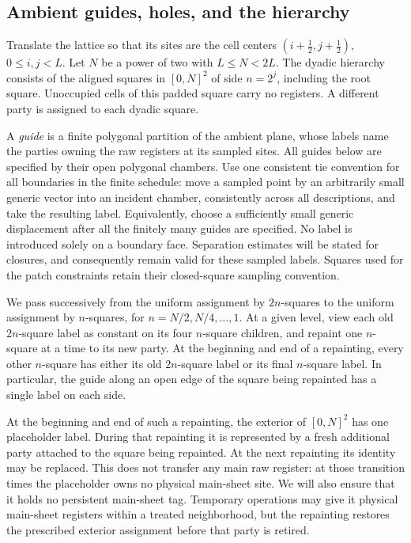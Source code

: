 \documentclass[11pt]{article}
\numberwithin{equation}{section}
\theoremstyle{definition}
\theoremstyle{remark}
\begin{document}
\subsection{Ambient guides, holes, and the hierarchy}

Translate the lattice so that its sites are the cell centers
$(i+\tfrac12,j+\tfrac12)$, $0\le i,j<L$.  Let $N$ be a power of two
with $L\le N<2L$.  The dyadic hierarchy consists of the aligned squares
in $[0,N]^2$ of side $n=2^j$, including the root square.  Unoccupied
cells of this padded square carry no registers.  A different party is
assigned to each dyadic square.

A \emph{guide} is a finite polygonal partition of the ambient plane,
whose labels name the parties owning the raw registers at its sampled
sites.  All guides below are specified by their open polygonal chambers.
Use one consistent tie convention for all boundaries in the finite
schedule: move a sampled point by an arbitrarily small generic vector
into an incident chamber, consistently across all descriptions, and
take the resulting label.  Equivalently, choose a sufficiently small
generic displacement after all the finitely many guides are specified.
No label is introduced solely on a boundary face.  Separation estimates
will be stated for closures, and consequently remain valid for these
sampled labels.  Squares used for the patch constraints retain their
closed-square sampling convention.

We pass successively from the uniform assignment by $2n$-squares to the
uniform assignment by $n$-squares, for
$n=N/2,N/4,\ldots,1$.  At a given level, view each old $2n$-square
label as constant on its four $n$-square children, and repaint one
$n$-square at a time to its new party.  At the beginning and end of a
repainting, every other $n$-square has either its old $2n$-square label
or its final $n$-square label.  In particular, the guide along an open
edge of the square being repainted has a single label on each side.

At the beginning and end of such a repainting, the exterior of
$[0,N]^2$ has one placeholder label.  During that repainting it is
represented by a fresh additional party attached to the square being
repainted.  At the next repainting its identity may be replaced.  This
does not transfer any main raw register: at those transition times the
placeholder owns no physical main-sheet site.  We will also ensure that
it holds no persistent main-sheet tag.  Temporary operations may give
it physical main-sheet registers within a treated neighborhood, but the
repainting restores the prescribed exterior assignment before that party
is retired.
\end{document}
